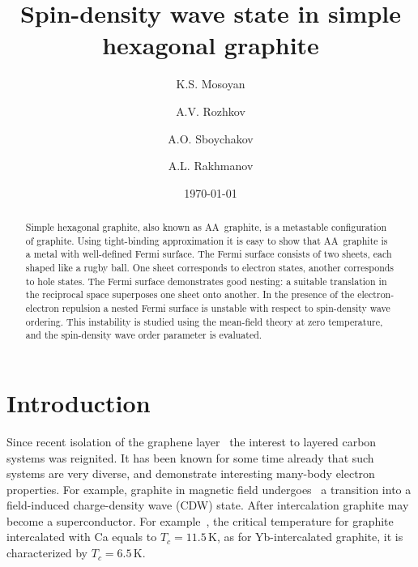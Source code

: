 \documentclass[prb,twocolumn,showpacs,aps,superscriptaddress,floatfix]{revtex4}
\begin{document}
\title{Spin-density wave state in simple hexagonal graphite}

\author{K.S. Mosoyan}

\author{A.V. Rozhkov}

\author{A.O. Sboychakov}

\author{A.L. Rakhmanov}

\begin{abstract}
Simple hexagonal graphite, also known as AA~graphite, is a metastable
configuration of graphite. Using tight-binding approximation it is easy to
show that AA~graphite is a metal with well-defined Fermi  surface. The
Fermi surface consists of two sheets, each shaped like a rugby ball.  One
sheet corresponds to electron states, another corresponds to hole states.
The Fermi surface demonstrates good nesting: a suitable translation in the
reciprocal space superposes one sheet onto another. In the presence of the
electron-electron repulsion a nested Fermi surface is unstable with respect
to spin-density wave ordering. This instability is studied using the
mean-field theory at zero temperature, and the spin-density wave order
parameter is evaluated.
\end{abstract}

\date{\today}

\maketitle

\section{Introduction}

Since recent isolation of the graphene
layer~\cite{graphene_novos2004}
the interest to layered carbon systems was reignited.
It has been known for some time already that such systems are very diverse,
and demonstrate interesting many-body electron properties. For example,
graphite in magnetic field
undergoes~\cite{cdw_magfield_exp2017}
a transition into a field-induced charge-density wave (CDW) state. After
intercalation graphite may become a superconductor. For
example~\cite{supercond_inter2005},
the critical temperature for graphite intercalated with Ca equals to
$T_c=11.5$\,K,
as for Yb-intercalated graphite, it is characterized by
$T_c=6.5$\,K.
\end{document}
